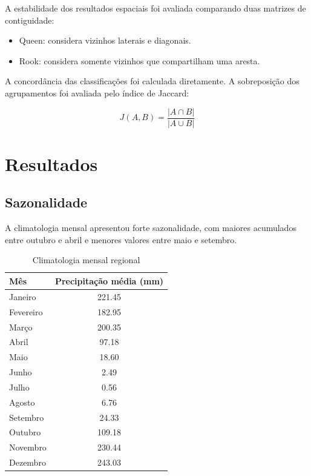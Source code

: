 \documentclass[12pt,a4paper]{article}
\begin{document}
A estabilidade dos resultados espaciais foi avaliada
comparando duas matrizes de contiguidade:

\begin{itemize}
    \item Queen: considera vizinhos laterais e diagonais.
    \item Rook: considera somente vizinhos que compartilham
    uma aresta.
\end{itemize}

A concordância das classificações foi calculada
diretamente. A sobreposição dos agrupamentos foi
avaliada pelo índice de Jaccard:

\begin{equation}
J(A,B) =
\frac{|A \cap B|}{|A \cup B|}
\end{equation}

\section{Resultados}

\subsection{Sazonalidade}

A climatologia mensal apresentou forte sazonalidade,
com maiores acumulados entre outubro e abril e
menores valores entre maio e setembro.

\begin{table}[H]
\centering
\caption{Climatologia mensal regional}
\begin{tabular}{lc}
\toprule
Mês & Precipitação média (mm) \\
\midrule
Janeiro & 221.45 \\
Fevereiro & 182.95 \\
Março & 200.35 \\
Abril & 97.18 \\
Maio & 18.60 \\
Junho & 2.49 \\
Julho & 0.56 \\
Agosto & 6.76 \\
Setembro & 24.33 \\
Outubro & 109.18 \\
Novembro & 230.44 \\
Dezembro & 243.03 \\
\bottomrule
\end{tabular}
\end{table}
\end{document}
